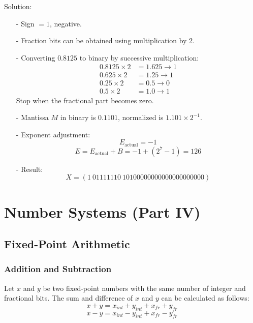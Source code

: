 \documentclass[12pt,openany, tikz,border=10pt]{book}
\begin{document}
			      	Solution:
			      	\begin{itemize}
			      		\item[-] Sign \( = 1 \), negative.
			      		\item[-] Fraction bits can be obtained using multiplication by 2.
			      		\item[-] Converting \( 0.8125 \) to binary by successive multiplication:
			      		      \begin{align*}
			      		      	0.8125 \times 2 & = 1.625 \rightarrow 1 \\
			      		      	0.625 \times 2  & = 1.25 \rightarrow 1  \\
			      		      	0.25 \times 2   & = 0.5 \rightarrow 0   \\
			      		      	0.5 \times 2    & = 1.0 \rightarrow 1   
			      		      \end{align*}
			      		      Stop when the fractional part becomes zero.
			      		\item[-] Mantissa \( M \) in binary is \( 0.1101 \), normalized is \( 1.101 \times 2^{-1} \).
			      		\item[-] Exponent adjustment:
			      		      \[ E_{\text{actual}} = -1 \]
			      		      \[ E = E_{\text{actual}} + B = -1 + (2^7 - 1) = 126 \]
			      		\item[-] Result:
			      		      \[ X = (1\ 01111110\ 10100000000000000000000) \]
			      	\end{itemize}
			      	
			      	
			      	\chapter{Number Systems (Part IV)}
			      	\section{Fixed-Point Arithmetic}
			      	\subsection{Addition and Subtraction}
			      	
			      	Let \( x \) and \( y \) be two fixed-point numbers with the same number of integer and fractional bits. The sum and difference of \( x \) and \( y \) can be calculated as follows:
			      	$$x + y = x_{int} + y_{int} + x_{fr} + y_{fr}$$ 
			      	$$x - y = x_{int} - y_{int} + x_{fr} - y_{fr}$$
			      	 
\end{document}
